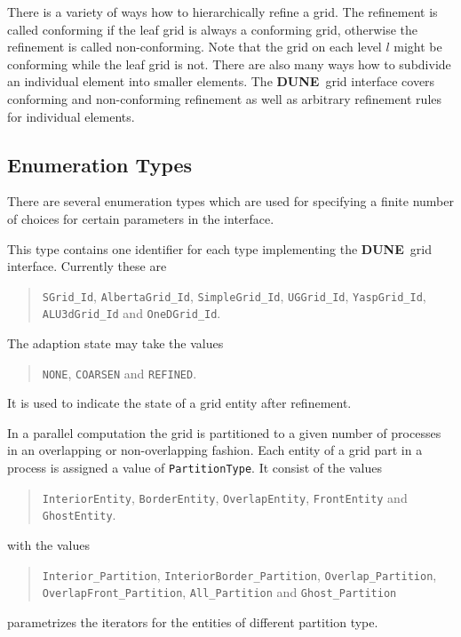 \documentclass[11pt,a4paper,headinclude,footinclude,DIV14,BCOR8.25mm,titlepage,twoside,openright,normalheadings]{scrreprt}
\newcommand{\Dune}{{\sf\bfseries DUNE}}
\begin{document}
There is a variety of ways how to hierarchically refine a grid. The
refinement is called conforming if the leaf grid is always a
conforming grid, otherwise the refinement is called
non-conforming. Note that the grid on each level $l$ might be
conforming while the leaf grid is not. 
There are also many ways how to subdivide an individual element into smaller elements. The
\Dune\ grid interface covers conforming and non-conforming
refinement as well as arbitrary refinement rules for individual
elements.


\subsection{Enumeration Types}

There are several enumeration types which are used for specifying a
finite number of choices for certain parameters in the interface.

 This type contains one identifier for each
type implementing the \Dune\ grid interface. Currently these are
\begin{quote}
\raggedright
\lstinline!SGrid_Id!, \lstinline!AlbertaGrid_Id!, \lstinline!SimpleGrid_Id!, \lstinline!UGGrid_Id!, 
\lstinline!YaspGrid_Id!, \lstinline!ALU3dGrid_Id! and \lstinline!OneDGrid_Id!.
\end{quote}

The adaption state may take the values
\begin{quote}
\raggedright
\lstinline!NONE!, \lstinline!COARSEN! and \lstinline!REFINED!.
\end{quote}
It is used to indicate the state of a grid entity after refinement.


In a parallel computation the grid is partitioned to a given number of
processes in an overlapping or non-overlapping fashion. Each entity of
a grid part in a process is assigned a value of
\lstinline!PartitionType!. It consist of the values
\begin{quote}
\raggedright
\lstinline!InteriorEntity!, \lstinline!BorderEntity!,
\lstinline!OverlapEntity!, \lstinline!FrontEntity! and
\lstinline!GhostEntity!.
\end{quote}


with the values
\begin{quote}
\raggedright
\lstinline!Interior_Partition!,
\lstinline!InteriorBorder_Partition!,
\lstinline!Overlap_Partition!,
\lstinline!OverlapFront_Partition!,
\lstinline!All_Partition! and
\lstinline!Ghost_Partition!
\end{quote}
parametrizes the iterators for the entities of different partition
type.
\end{document}
